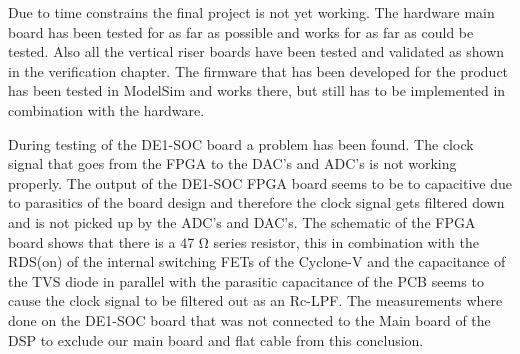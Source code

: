 Due to time constrains the final project is not yet working. The hardware main board has been tested for as far as possible and works for as far as could be tested. Also all the vertical riser boards have been tested and validated as shown in the verification chapter. The firmware that has been developed for the product has been tested in ModelSim and works there, but still has to be implemented in combination with the hardware. 
\par
\noindent During testing of the DE1-SOC board a problem has been found. The clock signal that goes from the FPGA to the DAC's and ADC's is not working properly. The output of the DE1-SOC FPGA board seems to be to capacitive due to parasitics of the board design and therefore the clock signal gets filtered down and is not picked up by the ADC's and DAC's. The schematic of the FPGA board shows that there is a 47 Ω series resistor, this in combination with the RDS(on) of the internal switching FETs of the Cyclone-V and the capacitance of the TVS diode in parallel with the parasitic capacitance of the PCB seems to cause the clock signal to be filtered out as an Rc-LPF. The measurements where done on the DE1-SOC board that was not connected to the Main board of the DSP to exclude our main board and flat cable from this conclusion.